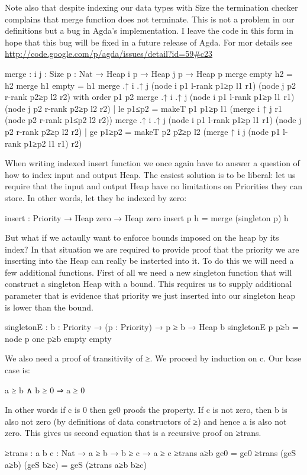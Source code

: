 Note also that despite indexing our data types with Size the
termination checker complains that merge function does not
terminate. This is not a problem in our definitions but a bug in
Agda's implementation. I leave the code in this form in hope that
this bug will be fixed in a future release of Agda. For mor details
see \url{http://code.google.com/p/agda/issues/detail?id=59\#c23}
\begin{code}
merge : {i j : Size} {p : Nat} → Heap {i} p → Heap {j} p → Heap p
merge empty h2 = h2
merge h1 empty = h1
merge .{↑ i} .{↑ j}
  (node {i} p1 l-rank p1≥p l1 r1)
  (node {j} p2 r-rank p2≥p l2 r2)
  with order p1 p2
merge .{↑ i} .{↑ j}
  (node {i} p1 l-rank p1≥p l1 r1)
  (node {j} p2 r-rank p2≥p l2 r2)
  | le p1≤p2
  = makeT p1 p1≥p l1 (merge {i} {↑ j} r1 (node p2 r-rank p1≤p2 l2 r2))
merge .{↑ i} .{↑ j}
  (node {i} p1 l-rank p1≥p l1 r1)
  (node {j} p2 r-rank p2≥p l2 r2)
  | ge p1≥p2
  = makeT p2 p2≥p l2 (merge {↑ i} {j} (node p1 l-rank p1≥p2 l1 r1) r2)
\end{code}


When writing indexed insert function we once again have to answer a
question of how to index input and output Heap. The easiest
solution is to be liberal: let us require that the input and output
Heap have no limitations on Priorities they can store. In other
words, let they be indexed by zero:
\begin{code}
insert : Priority → Heap zero → Heap zero
insert p h = merge (singleton p) h
\end{code}


But what if we actaully want to enforce bounds imposed on the heap
by its index? In that situation we are required to provide proof
that the priority we are inserting into the Heap can really be
insterted into it. To do this we will need a few additional
functions. First of all we need a new singleton function that will
construct a singleton Heap with a bound. This requires us to supply
additional parameter that is evidence that priority we just
inserted into our singleton heap is lower than the bound.
\begin{code}
singletonE : {b : Priority} → (p : Priority) → p ≥ b → Heap b
singletonE p p≥b = node p one p≥b empty empty
\end{code}


We also need a proof of transitivity of ≥. We proceed by induction
on c. Our base case is:

  a ≥ b ∧ b ≥ 0 ⇒ a ≥ 0

In other words if c is 0 then ge0 proofs the property. If c is not
zero, then b is also not zero (by definitions of data constructors
of ≥) and hence a is also not zero. This gives us second equation
that is a recursive proof on ≥trans.
\begin{code}
≥trans : {a b c : Nat} → a ≥ b → b ≥ c → a ≥ c
≥trans a≥b        ge0      = ge0
≥trans (geS a≥b) (geS b≥c) = geS (≥trans a≥b b≥c)
\end{code}


